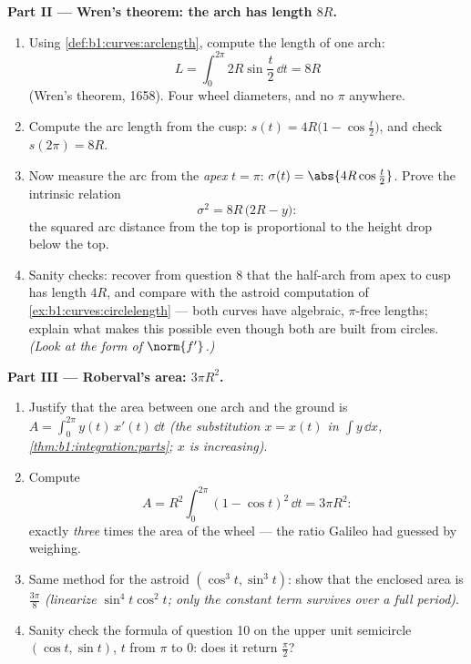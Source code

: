 \begin{problem}
\medskip
\noindent\textbf{Part II --- Wren's theorem: the arch has length
$8R$.}
\begin{enumerate}[resume]
  \item Using \cref{def:b1:curves:arclength}, compute the length
        of one arch:
        \[
        L = \int_0^{2\pi} 2R\sin\frac t2\,\dd t = 8R
        \]
        (Wren's theorem, 1658). Four wheel diameters, and no
        $\pi$ anywhere.
  \item Compute the arc length from the cusp: $s(t) =
        4R\bigl(1 - \cos\frac t2\bigr)$, and check $s(2\pi) =
        8R$.
  \item Now measure the arc from the \emph{apex} $t = \pi$:
        $\sigma(t) = \abs{4R\cos\frac t2}$. Prove the intrinsic
        relation
        \[
        \sigma^2 = 8R\,\bigl(2R - y\bigr) :
        \]
        the squared arc distance from the top is proportional to
        the height drop below the top.
  \item Sanity checks: recover from question 8 that the half-arch
        from apex to cusp has length $4R$, and compare with the
        astroid computation of \cref{ex:b1:curves:circlelength}
        --- both curves have algebraic, $\pi$-free lengths;
        explain what makes this possible even though both are
        built from circles. \emph{(Look at the form of
        $\norm{f'}$.)}
\end{enumerate}

\medskip
\noindent\textbf{Part III --- Roberval's area: $3\pi R^2$.}
\begin{enumerate}[resume]
  \item Justify that the area between one arch and the ground is
        $A = \int_0^{2\pi} y(t)\,x'(t)\,\dd t$ \emph{(the
        substitution $x = x(t)$ in $\int y\,\dd x$,
        \cref{thm:b1:integration:parts}; $x$ is increasing)}.
  \item Compute
        \[
        A = R^2\int_0^{2\pi}(1 - \cos t)^2\,\dd t = 3\pi R^2 :
        \]
        exactly \emph{three} times the area of the wheel ---
        the ratio Galileo had guessed by weighing.
  \item Same method for the astroid $(\cos^3t, \sin^3t)$: show
        that the enclosed area is $\frac{3\pi}8$
        \emph{(linearize $\sin^4 t\cos^2 t$; only the constant
        term survives over a full period)}.
  \item Sanity check the formula of question 10 on the upper unit
        semicircle $(\cos t, \sin t)$, $t$ from $\pi$ to $0$:
        does it return $\frac\pi2$?
\end{enumerate}


\end{problem}
